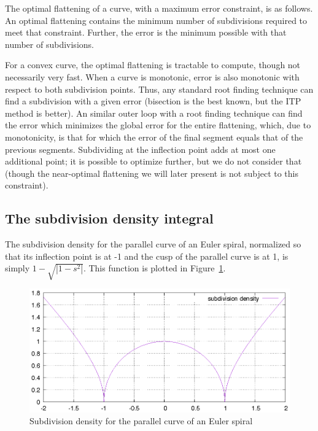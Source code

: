 \documentclass[sigconf, authordraft]{acmart}
\begin{document}
The optimal flattening of a curve, with a maximum error constraint, is as follows. An optimal flattening contains the minimum number of subdivisions required to meet that constraint. Further, the error is the minimum possible with that number of subdivisions.

For a convex curve, the optimal flattening is tractable to compute, though not necessarily very fast. When a curve is monotonic, error is also monotonic with respect to both subdivision points. Thus, any standard root finding technique can find a subdivision with a given error (bisection is the best known, but the ITP method \citet{Oliveira2020} is better). An similar outer loop with a root finding technique can find the error which minimizes the global error for the entire flattening, which, due to monotonicity, is that for which the error of the final segment equals that of the previous segments. Subdividing at the inflection point adds at most one additional point; it is possible to optimize further, but we do not consider that (though the near-optimal flattening we will later present is not subject to this constraint).

\subsection{The subdivision density integral}

The subdivision density for the parallel curve of an Euler spiral, normalized so that its inflection point is at -1 and the cusp of the parallel curve is at 1, is simply $1 - \sqrt{|1-s^2|}$. This function is plotted in Figure~\ref{fig:subdiv_density}.

\begin{figure}
    \includegraphics[scale=0.6]{subdiv_density}
    \caption{Subdivision density for the parallel curve of an Euler spiral}
    \label{fig:subdiv_density}
\end{figure}
\end{document}
